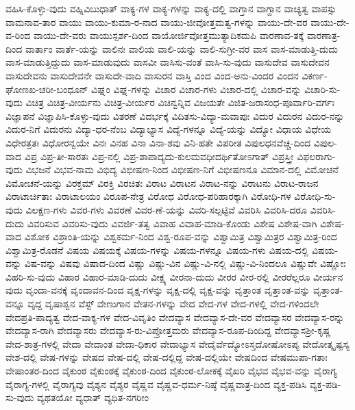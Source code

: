 {ವಹಿಸಿ-ಕೊಳ್ಳು-ವುದು
ವಹ್ನಿವಿಬುಧಾತ್
ವಾಕ್ಯ-ಗಳ
ವಾಕ್ಯ-ಗಳನ್ನು
ವಾಕ್ಯ-ದಲ್ಲಿ
ವಾಗ್ತಾನ
ವಾಗ್ದಾನ
ವಾಚ್ಯತ್ವ
ವಾಪಸ್ಸು
ವಾಮನಾವ-ತಾರ
ವಾಯು
ವಾಯು-ಕುಮಾ-ರ-ನಾದ
ವಾಯು-ಜೀವೋತ್ತಮತ್ವ-ಗಳನ್ನು
ವಾಯು-ದೇ-ವರ
ವಾಯು-ದೇ-ವ-ರಿಂದ
ವಾಯು-ದೇ-ವರು
ವಾಯುಸ್ಪರ್ಶ-ದಿಂದ
ವಾಯೋರ್ಜಿವೋತ್ತಮುತ್ಯಾದಿಕಮಪಿ
ವಾರಣಾವ-ತಕ್ಕೆ
ವಾರಣಾತ್ರ-ದಿಂದ
ವಾರ್ತಾಂ
ವಾರ್ತೆ-ಯನ್ನು
ವಾಲಿನಃ
ವಾಲಿಯ
ವಾಲಿ-ಯನ್ನು
ವಾಲಿ-ಸುಗ್ರೀ-ವರ
ವಾಸ
ವಾಸ-ಮಾಡುತ್ತಿ-ದುದು
ವಾಸ-ಮಾಡುತ್ತಿದ್ದುದು
ವಾಸ-ಮಾಡುವುದು
ವಾಸವೀ
ವಾಸಿಸು-ವಂತೆ
ವಾಸಿ-ಸು-ವುದು
ವಾಸುದೇವ
ವಾಸುದೇವನ
ವಾಸುದೇವನು
ವಾಸುದೇವನೇ
ವಾಸುದೇ-ವಾದಿ
ವಾಸುರನ
ವಾಸ್ತಿ
ವಿಂದ
ವಿಂದ-ಅನು-ವಿಂದರ
ವಿಂದನ
ವಿಕರ್ಣ-ಘೋಣಖ-ಚರೀ-ಬಂಧೂನ್
ವಿಘ್ನಂ
ವಿಘ್ನ-ಗಳನ್ನು
ವಿಚಾರ
ವಿಚಾರ-ಗಳು
ವಿಚಾರ-ದಲ್ಲಿ
ವಿಚಾರ-ವನ್ನು
ವಿಚಾರಿ-ಸು-ವುದು
ವಿಚಿತ್ರ
ವಿಚಿತ್ರ-ವೀರ್ಯನು
ವಿಚಿತ್ರ-ವೀರ್ಯರ
ವಿಚಿನ್ವನ್ನಿವ
ವಿಜಯತೇ
ವಿಜಿತ-ಜರಾಸಂಧ-ಪೂರ್ವಾರಿ-ವರ್ಗಃ
ವಿಜ್ಞಾಪನೆ
ವಿಜ್ಞಾಪಿಸಿ-ಕೊಳ್ಳು-ವುದು
ವಿತರಣೆ
ವಿದರ್ಭಕ್ಕೆ
ವಿದಿತಸು-ವಿದ್ಯಾ-ಮವಾಪುಃ
ವಿದುರ
ವಿದುರನ
ವಿದುರ-ನನ್ನು
ವಿದುರ-ನಿಗೆ
ವಿದುರನು
ವಿದ್ಯಾ-ಧರ-ನೆಂಬ
ವಿದ್ಯಾಭ್ಯಾಸ
ವಿದ್ಯೆ-ಗಳನ್ನೂ
ವಿದ್ಯೆ-ಯನ್ನು
ವಿದ್ಯೋ
ವಿಧಾಯ
ವಿಧೇಯ
ವಿಧೇರತ್ರತಃ
ವಿಧೋರನ್ವಯೇ
ವಿನಃ
ವಿನಹ
ವಿನಾ
ವಿನಾ-ಶವು
ವಿನಿ-ಹತೇ
ವಿಪರೀತ
ವಿಪುಲಧನವೆಚ್ಚ-ದಿಂದ
ವಿಪುಲ-ವಾದ
ವಿಪ್ರ
ವಿಪ್ರ-ತೀ-ಸಾರತಃ
ವಿಪ್ರ-ನಲ್ಲಿ
ವಿಪ್ರ-ಶಾಪಾದ್ಯದು-ಕುಲಮವಧೀದರ್ಥಿತೋಽಗಾತ್
ವಿಪ್ರಸ್ತ್ರೀ
ವಿಫಲರಾಗು-ವುದು
ವಿಭಜನೆ
ವಿಭವ-ನಾಮ
ವಿಭಿದ್ಯ
ವಿಭೀಷಣ-ನಿಂದ
ವಿಭೀಷಣ-ನಿಗೆ
ವಿಭೀಷಣನೂ
ವಿಮಾನ-ದಲ್ಲಿ
ವಿಮೋಚನೆ
ವಿಮೋಚನೆ-ಯನ್ನು
ವಿರಕ್ತಮ್
ವಿರಕ್ತಿ
ವಿರಚಿತಃ
ವಿರಾಟ
ವಿರಾಟನ
ವಿರಾಟ-ನನ್ನು
ವಿರಾಟನು
ವಿರಾಟ-ರಾಜನ
ವಿರಾಟಾರ್ಚಿತಾಃ
ವಿರಾಟಾಲಯಂ
ವಿರೂಪ-ನೇತ್ರ
ವಿರೋಧ
ವಿರೋಧ-ಪರಿಹಾರಕ್ಕಾಗಿ
ವಿರೋಧಿ-ಗಳ
ವಿರೋಧಿ-ಸು-ವುದು
ವಿಲಕ್ಷಣ-ಗಳು
ವಿವರ-ಗಳು
ವಿವರಣೆ
ವಿವರ-ಣೆ-ಯನ್ನು
ವಿವರಿ-ಸಲ್ಪಟ್ಟಿವೆ
ವಿವರಿಸಿ
ವಿವರಿಸಿ-ದರೂ
ವಿವರಿಸಿ-ದುದು
ವಿವರಿಸುವ
ವಿವರಿಸು-ವುದು
ವಿವರ್ಜಿ-ತತ್ವ
ವಿವಾಹ
ವಿವಾಹ-ಮಾಡಿ-ಕೊಂಡು
ವಿಶೇಷ
ವಿಶೇಷ-ವಾಗಿ
ವಿಶೇಷ-ವಾದ
ವಿಶೋಕ
ವಿಶ್ರಾಂತಿ-ಯನ್ನು
ವಿಶ್ವಕರ್ಮ-ನಿಂದ
ವಿಶ್ವ-ರೂಪ-ವನ್ನು
ವಿಶ್ವಾಮಿತ್ರ
ವಿಶ್ವಾಮಿತ್ರರ
ವಿಶ್ವಾಮಿತ್ರ-ರಿಂದ
ವಿಶ್ವಾಮಿತ್ರ-ರೊಡನೆ
ವಿಷಯ
ವಿಷಯಕ್ಕೆ
ವಿಷಯ-ಗಳನ್ನು
ವಿಷಯ-ಗಳನ್ನೂ
ವಿಷಯ-ಗಳು
ವಿಷಯ-ದಲ್ಲಿ
ವಿಷಯ-ವನ್ನು
ವಿಷ-ವನ್ನು
ವಿಷವು
ವಿಷಾದ-ದಿಂದ
ವಿಷ್ಣು
ವಿಷ್ಣು-ವಿನ
ವಿಷ್ಣು-ವಿ-ನಲ್ಲಿ
ವಿಷ್ಣು-ವಿ-ನಿಂದಲೂ
ವಿಷ್ಣುವೇ
ವಿಷ್ಣೋಃ
ವಿಹರಿ-ಸು-ವುದು
ವಿಹಾರ
ವಿಹಾರ-ಮಾಡಿ-ದುದು
ವೀಕ್ಷ್ಯ
ವೀರನಾ-ದುದು
ವೀರರ
ವೀರ-ರಲ್ಲಿ
ವೀರರೆಲ್ಲರೂ
ವೀರ್ಯನ
ವುದು
ವೃಂದಾ-ವನಕ್ಕೆ
ವೃಂದಾವನ-ದಿಂದ
ವೃಕ್ಷ-ಗಳನ್ನು
ವೃಕ್ಷ-ದಲ್ಲಿ
ವೃಕ್ಷ-ವನ್ನು
ವೃತ್ತಾಂತ
ವೃತ್ತಾಂತ-ವನ್ನು
ವೃತ್ತಾಂತ-ವನ್ನೂ
ವೃದ್ದ
ವೃಷಾಶ್ವನ
ವೆಸ್ಟ್
ವೇಣುಗಾನ
ವೇತನ-ಗಳನ್ನು
ವೇದ
ವೇದ-ಗಳ
ವೇದ-ಗಳಲ್ಲಿ
ವೇದ-ಗಳಿಂದಲೇ
ವೇದಪ್ರತಿ-ಪಾದ್ಯತ್ವ
ವೇದ-ವಾಕ್ಯ-ಗಳ
ವೇದ-ವಿವೃತಿಂ
ವೇದವ್ಯಾಸ
ವೇದವ್ಯಾಸ-ದೇ-ವರ
ವೇದವ್ಯಾಸರ
ವೇದವ್ಯಾಸ-ರನ್ನು
ವೇದವ್ಯಾಸ-ರಾಗಿ
ವೇದವ್ಯಾಸರು
ವೇದವ್ಯಾಸ-ರು-ವಿಪ್ರೋತ್ತಮರು
ವೇದವ್ಯಾಸ-ರೂಪ-ದಿಂದಿದ್ದ
ವೇದವ್ಯಾಸಶ್ರೀ-ಕೃಷ್ಣ
ವೇದ-ಶಾತ್ರ-ಗಳಲ್ಲಿ
ವೇದಾ
ವೇದಾಂತ
ವೇದಾ-ಧಿಕಾರ
ವೇದಾಭ್ಯಾಸ
ವೇದೈರ್ವೆದ್ಯೋಽಸ್ತದೋಷೋಽಪ್ಯ
ವೇದೋತ್ಕೃಷ್ಟಸ್ಯ
ವೇಶ-ದಲ್ಲಿ
ವೇಷ-ಗಳನ್ನು
ವೇಷದ
ವೇಷ-ದಲ್ಲಿ
ವೇಷ-ದಲ್ಲಿದ್ದ
ವೇಷ-ದಲ್ಲಿಯೇ
ವೇಷದಿಂದ
ವೇಷಮುಪಾ-ಗತಾಃ
ವೇಷಾಂತರ-ದಿಂದ
ವೈಕುಂಠ
ವೈಕುಂಠಕ್ಕೆ
ವೈಕುಂಠ-ದಿಂದ
ವೈಕುಂಠ-ಲೋಕಕ್ಕೆ
ವೈಖರಿ
ವೈಭವ
ವೈಭವ-ವನ್ನು
ವೈರಾಗ್ಯ
ವೈರಾಗ್ಯ-ಗಳಲ್ಲಿ
ವೈರಾಗ್ಯವು
ವೈಶ್ಯನ
ವೈಶ್ಯರ
ವೈಷ್ಣವ
ವೈಷ್ಣವ-ಧರ್ಮ-ನಿಷ್ಠೆ
ವೈಷ್ಣವಾತ್ರ-ದಿಂದ
ವ್ಯಕ್ತ-ಪಡಿಸಿ
ವ್ಯಕ್ತ-ಪಡಿ-ಸು-ವುದು
ವ್ಯಥತಯೋ
ವ್ಯಧಾತ್
ವ್ಯಧಿತ-ನಗರೀಂ
}
